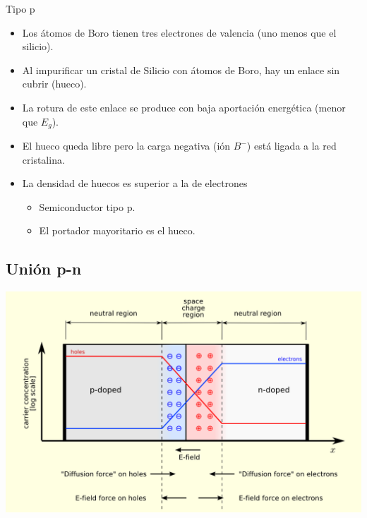 \documentclass[xcolor={usenames,svgnames,dvipsnames}]{beamer}
\begin{document}
\begin{frame}[label=sec-1-3-4]{Tipo p}
\begin{itemize}
\item Los átomos de \alert{Boro} tienen tres electrones de valencia (uno menos
que el silicio).

\item Al impurificar un cristal de Silicio con átomos de Boro, hay un
enlace sin cubrir (hueco).

\item La rotura de este enlace se produce con \alert{baja aportación energética}
   (menor que $E_{g}$).

\item El \alert{hueco queda libre} pero la \alert{carga negativa (ión $B^{-}$) está
ligada} a la red cristalina.

\item La \alert{densidad de huecos} es \alert{superior a la de electrones}

\begin{itemize}
\item Semiconductor \alert{tipo p}.

\item El \alert{portador mayoritario} es el \alert{hueco}.
\end{itemize}
\end{itemize}
\end{frame}

\subsection{Unión p-n}
\label{sec-1-4}


\begin{frame}[label=sec-1-4-1]{}
\includegraphics[width=.9\linewidth]{../figs/Pn-junction-equilibrium.png}
\end{frame}
\end{document}
